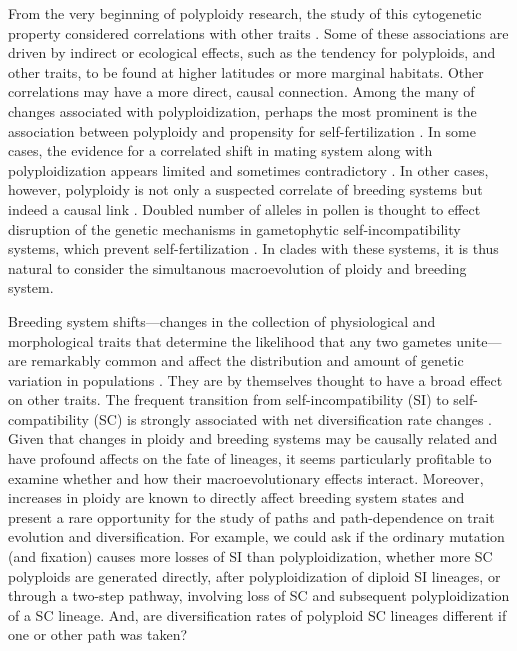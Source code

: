 From the very beginning of polyploidy research, the study of this cytogenetic property considered correlations with other traits \citep{stebbins1938}. 
Some of these associations are driven by indirect or ecological effects, such as the tendency for polyploids, and other traits, to be found at higher latitudes or more marginal habitats. %
Other correlations may have a more direct, causal connection.
Among the many of changes associated with polyploidization, perhaps the most prominent is the association between polyploidy and propensity for self-fertilization \citep{stebbins1950, barrett1988}.
In some cases, the evidence for a correlated shift in mating system along with polyploidization appears limited and sometimes contradictory \citep{barringer2007, barrett2008, husband2008}.
In other cases, however, polyploidy is not only a suspected correlate of breeding systems but indeed a causal link \citep{stout1942, lewis1947}.
Doubled number of alleles in pollen is thought to effect disruption of the genetic mechanisms in gametophytic self-incompatibility systems, which prevent self-fertilization \citep{entani1999, tsukamoto2005, kubo2010}. 
In clades with these systems, it is thus natural to consider the simultanous macroevolution of ploidy and breeding system.

Breeding system shifts---changes in the collection of physiological and morphological traits that determine the likelihood that any two gametes unite---are remarkably common and affect the distribution and amount of genetic variation in populations \citep{stebbins1974,barrett2013}.
They are by themselves thought to have a broad effect on other traits. 
The frequent transition from self-incompatibility (SI) to self-compatibility (SC) is strongly associated with net diversification rate changes \citep{goldberg_2010,devos2014}.
Given that changes in ploidy and breeding systems may be causally related and have profound affects on the fate of lineages, it seems particularly profitable to examine whether and how their macroevolutionary effects interact.
Moreover, increases in ploidy are known to directly affect breeding system states and present a rare opportunity for the study of paths and path-dependence on trait evolution and diversification.
For example, we could ask if the ordinary mutation (and fixation) causes more losses of SI than polyploidization, whether more SC polyploids are generated directly, after polyploidization of diploid SI lineages, or through a two-step pathway, involving loss of SC and subsequent polyploidization of a SC lineage.
And, are diversification rates of polyploid SC lineages different if one or other path was taken? \citet{charlesworth1985} 
%
%


